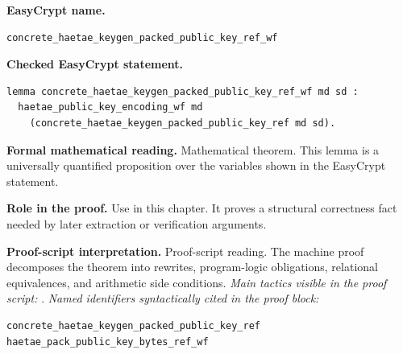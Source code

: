 \begin{formaltheorem}
\noindent\textbf{EasyCrypt name.}
\begin{lstlisting}[language=EasyCrypt,basicstyle=\ttfamily\scriptsize]
concrete_haetae_keygen_packed_public_key_ref_wf
\end{lstlisting}
\noindent\textbf{Checked EasyCrypt statement.}
\begin{lstlisting}[language=EasyCrypt,basicstyle=\ttfamily\scriptsize]
lemma concrete_haetae_keygen_packed_public_key_ref_wf md sd :
  haetae_public_key_encoding_wf md
    (concrete_haetae_keygen_packed_public_key_ref md sd).
\end{lstlisting}
\noindent\textbf{Formal mathematical reading.}
Mathematical theorem. This lemma is a universally quantified proposition over the variables shown in the EasyCrypt statement.

\noindent\textbf{Role in the proof.}
Use in this chapter. It proves a structural correctness fact needed by later extraction or verification arguments.

\noindent\textbf{Proof-script interpretation.}
Proof-script reading. The machine proof decomposes the theorem into rewrites, program-logic obligations, relational equivalences, and arithmetic side conditions.
\emph{Main tactics visible in the proof script:} .
\emph{Named identifiers syntactically cited in the proof block:}
\begin{lstlisting}[language=EasyCrypt,basicstyle=\ttfamily\scriptsize]
concrete_haetae_keygen_packed_public_key_ref
haetae_pack_public_key_bytes_ref_wf
\end{lstlisting}

\end{formaltheorem}

